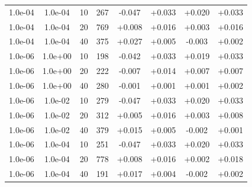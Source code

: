 \documentclass[11pt,a4paper]{article}
\begin{document}
\begin{table}
\begin{tabular}{*{8}c}
 1.0e-04 	 & 1.0e-04 	 & 10 & 267 	 & -0.047 & +0.033 & +0.020 & +0.033 \\ 
 1.0e-04 	 & 1.0e-04 	 & 20 & 769 	 & +0.008 & +0.016 & +0.003 & +0.016 \\
 1.0e-04 	 & 1.0e-04 	 & 40 & 375 	 & +0.027 & +0.005 & -0.003 & +0.002 \\ 
 
 1.0e-06 	 & 1.0e+00 	 & 10 & 198 	 & -0.042 & +0.033 & +0.019 & +0.033 \\ 
 1.0e-06 	 & 1.0e+00 	 & 20 & 222 	 & -0.007 & +0.014 & +0.007 & +0.007 \\ 
 1.0e-06 	 & 1.0e+00 	 & 40 & 280 	 & -0.001 & +0.001 & +0.001 & +0.002 \\ 
 
 1.0e-06 	 & 1.0e-02 	 & 10 & 279 	 & -0.047 & +0.033 & +0.020 & +0.033 \\ 
 1.0e-06 	 & 1.0e-02 	 & 20 & 312 	 & +0.005 & +0.016 & +0.003 & +0.008 \\ 
 1.0e-06 	 & 1.0e-02 	 & 40 & 379 	 & +0.015 & +0.005 & -0.002 & +0.001 \\
 
 1.0e-06 	 & 1.0e-04 	 & 10 & 251 	 & -0.047 & +0.033 & +0.020 & +0.033 \\ 
 1.0e-06 	 & 1.0e-04 	 & 20 & 778 	 & +0.008 & +0.016 & +0.002 & +0.018 \\ 
 1.0e-06 	 & 1.0e-04 	 & 40 & 191 	 & +0.017 & +0.004 & -0.002 & +0.002 \\ 
 

\end{tabular}
\label{TAB::double}
\end{table} 
\end{document}
